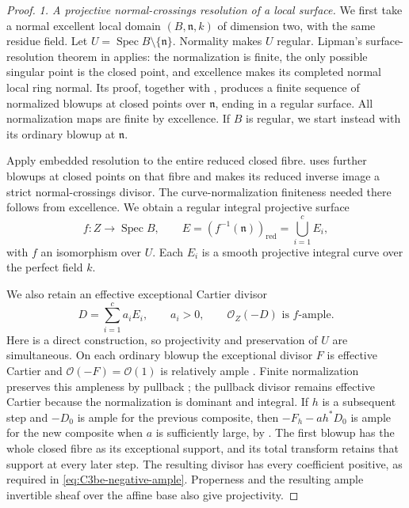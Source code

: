 \begin{proof}
\emph{1. A projective normal-crossings resolution of a local surface.}
We first take a normal excellent local domain
\((B,\mathfrak n,k)\) of dimension two, with the same residue
field. Let \(U=\operatorname{Spec}B\setminus\{\mathfrak n\}\).
Normality makes \(U\) regular. Lipman's surface-resolution theorem
in \citet[Theorem 54.14.5, Tag 0BGP]{frC3beStacksLipman}
applies: the normalization is finite, the only possible singular
point is the closed point, and excellence makes its completed
normal local ring normal. Its proof, together with
\citet[Lemma 54.6.5, Tag 0BFZ]{frC3beStacksNormalizedPointBlowups},
produces a finite sequence of normalized blowups at closed points
over \(\mathfrak n\), ending in a regular surface. All normalization
maps are finite by excellence. If \(B\) is regular, we start
instead with its ordinary blowup at \(\mathfrak n\).

Apply embedded resolution to the entire reduced closed fibre.
\citet[Lemma 54.15.6, Tag 0BIC]{frC3beStacksSurfaceSNC}
uses further blowups at closed points on that fibre and makes its
reduced inverse image a strict normal-crossings divisor. The
curve-normalization finiteness needed there follows from
excellence. We obtain a regular integral projective surface
\[
 f:Z\longrightarrow\operatorname{Spec}B,\qquad
 E=(f^{-1}(\mathfrak n))_{\mathrm{red}}=\bigcup_{i=1}^{c}E_i,
\]
with \(f\) an isomorphism over \(U\). Each \(E_i\) is a smooth
projective integral curve over the perfect field \(k\).

We also retain an effective exceptional Cartier divisor
\begin{equation}\label{eq:C3be-negative-ample}
 D=\sum_{i=1}^{c}a_iE_i,\qquad a_i>0,\qquad
                    \mathcal O_Z(-D)\text{ is }f\text{-ample}.
\end{equation}
Here is a direct construction, so projectivity and preservation
of \(U\) are simultaneous. On each ordinary blowup the exceptional
divisor \(F\) is effective Cartier and
\(\mathcal O(-F)=\mathcal O(1)\) is relatively ample
\citep[Section 31.33 and Lemma 31.33.4, Tag 02OS]
{frC3beStacksBlowupTautological}. Finite normalization preserves
this ampleness by pullback
\citep[Lemma 30.17.2, Tag 0B5V]{frC3beStacksFiniteAmple};
the pullback divisor remains effective Cartier because the
normalization is dominant and integral. If \(h\) is a subsequent
step and \(-D_0\) is ample for the previous composite, then
\(-F_h-a h^*D_0\) is ample for the new composite when \(a\)
is sufficiently large, by
\citet[Lemma 29.38.8, Tag 0C4K]{frC3beStacksCompositeAmple}.
The first blowup has the whole closed fibre as its exceptional
support, and its total transform retains that support at every
later step. The resulting divisor has every coefficient positive,
as required in \eqref{eq:C3be-negative-ample}. Properness and
the resulting ample invertible sheaf over the affine base also
give projectivity.


\end{proof}
